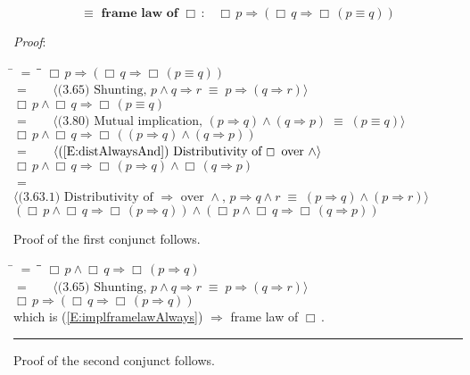 \documentclass[12pt, fleqn, leqno]{article}
\newcommand{\lgap}{2pt}                             %
\newcommand{\mymathindent}{24pt}                    %
\newcommand{\equivs}{\ensuremath{\;\equiv\;}}       %
\newcommand{\impl}{\ensuremath{\Rightarrow}}        %
\newcommand{\Always}{\Box\,}
\newcommand{\myqed}{\rule[-.23ex]{1.2ex}{2.0ex}}
\newcommand{\myqedtab}{\hspace{384pt}}              %
\newcommand{\Gll} {\langle}                         %
\newcommand{\Ggg} {\rangle}                         %
\newcommand{\Hint}[1]     {\ \ \ $\Gll              \mbox{#1} \Ggg$ }   %
\begin{document}
\begin{equation}\label{E:equivframelawAlways}
\textbf{$\equiv$ frame law of $\Always$:}\quad \Always p \impl (\Always q \impl \Always (p \equiv q))
\end{equation}

\emph{Proof}: 
\begin{tabbing}
\hspace{\mymathindent} \= $= \;$ \= \myqedtab \= \kill
  \> \>   $\Always p \impl (\Always q \impl \Always (p \equiv q)) $\\[\lgap]
  \> $=$  \>  \Hint{(3.65) Shunting, $p\land q\impl r\equivs p\impl (q\impl r)$}\\[\lgap]
  \> \>   $\Always p \land \Always q \impl \Always (p \equiv q) $\\[\lgap]
  \> $=$  \>  \Hint{(3.80) Mutual implication, $(p\impl q) \land (q\impl p) \equivs (p\equiv q)$}\\[\lgap]
  \> \>   $\Always p \land \Always q \impl \Always ( (p \impl  q) \land (q \impl  p))$\\[\lgap]
     \> $=$  \>  \Hint{(\ref{E:distAlwaysAnd}) Distributivity of $\Always$ over $\land$}\\[\lgap]
  \> \>   $\Always p \land \Always q \impl \Always (p \impl  q) \land \Always (q \impl  p)$\\[\lgap]
  \> $=$  \>  \Hint{(3.63.1) Distributivity of $\impl$ over $\land$, $p\impl q\land r\equivs (p\impl q)\land (p\impl r)$}\\[\lgap]
  \> \>   $(\Always p \land \Always q \impl \Always( p \impl  q)) \land (\Always p \land \Always q \impl \Always (q \impl p))$
  \end{tabbing}
Proof of the first conjunct follows.
\begin{tabbing}
\hspace{\mymathindent} \= $= \;$ \= \myqedtab \= \kill
  \> \>   $\Always p \land \Always q \impl \Always( p \impl  q)$\\[\lgap]
  \> $=$  \>  \Hint{(3.65) Shunting, $p\land q\impl r\equivs p\impl (q\impl r)$}\\[\lgap]
  \> \>   $\Always p \impl ( \Always q \impl \Always( p \impl  q))$\\[\lgap]
  \> which is (\ref{E:implframelawAlways}) $\impl$ frame law of $\Always$. \quad \myqed
\end{tabbing}
Proof of the second conjunct follows.
\end{document}
